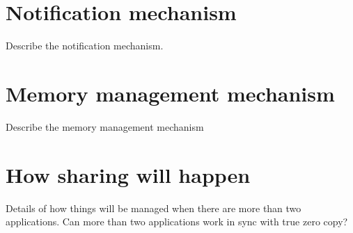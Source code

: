 \documentclass[a4paper,twoside]{report} %
\begin{document}
\section{Notification mechanism}
Describe the notification mechanism.

\section{Memory management mechanism}
Describe the memory management mechanism

\section{How sharing will happen}
Details of how things will be managed when there are more than two
applications. Can more than two applications work in sync with true 
zero copy?
\end{document}
